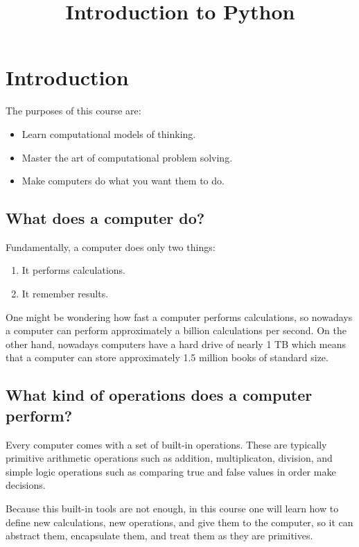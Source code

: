 \documentclass[a4paper]{article}
\title{Introduction to Python}
\author{}
\date{}
\begin{document}
\maketitle

\section{Introduction}

The purposes of this course are:

\begin{itemize}
  \item Learn computational models of thinking.
  \item Master the art of computational problem solving.
  \item Make computers do what you want them to do.
\end{itemize}

\subsection{What does a computer do?}

Fundamentally, a computer does only two things:

\begin{enumerate}
  \item It performs calculations.
  \item It remember results.
\end{enumerate}

One might be wondering how fast a computer performs calculations, so nowadays
a computer can perform approximately a billion calculations per second.
On the other hand, nowadays computers have a hard drive of nearly 1 TB which
means that a computer can store approximately 1.5 million books of standard
size.

\subsection{What kind of operations does a computer perform?}

Every computer comes with a set of built-in operations. These are typically
primitive arithmetic operations such as addition, multiplicaton, division, and
simple logic operations such as comparing true and false values in order make
decisions.

Because this built-in tools are not enough, in this course one will learn how
to define new calculations, new operations, and give them to the computer, so
it can abstract them, encapsulate them, and treat them as they are primitives.
\end{document}

